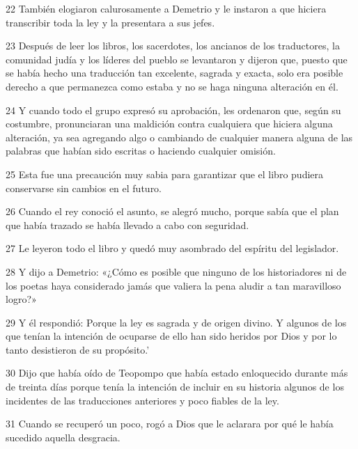 \par 22 También elogiaron calurosamente a Demetrio y le instaron a que hiciera transcribir toda la ley y la presentara a sus jefes.

\par 23 Después de leer los libros, los sacerdotes, los ancianos de los traductores, la comunidad judía y los líderes del pueblo se levantaron y dijeron que, puesto que se había hecho una traducción tan excelente, sagrada y exacta, solo era posible derecho a que permanezca como estaba y no se haga ninguna alteración en él.

\par 24 Y cuando todo el grupo expresó su aprobación, les ordenaron que, según su costumbre, pronunciaran una maldición contra cualquiera que hiciera alguna alteración, ya sea agregando algo o cambiando de cualquier manera alguna de las palabras que habían sido escritas o haciendo cualquier omisión.

\par 25 Esta fue una precaución muy sabia para garantizar que el libro pudiera conservarse sin cambios en el futuro.

\par 26 Cuando el rey conoció el asunto, se alegró mucho, porque sabía que el plan que había trazado se había llevado a cabo con seguridad.

\par 27 Le leyeron todo el libro y quedó muy asombrado del espíritu del legislador.

\par 28 Y dijo a Demetrio: «¿Cómo es posible que ninguno de los historiadores ni de los poetas haya considerado jamás que valiera la pena aludir a tan maravilloso logro?»

\par 29 Y él respondió: Porque la ley es sagrada y de origen divino. Y algunos de los que tenían la intención de ocuparse de ello han sido heridos por Dios y por lo tanto desistieron de su propósito.'

\par 30 Dijo que había oído de Teopompo que había estado enloquecido durante más de treinta días porque tenía la intención de incluir en su historia algunos de los incidentes de las traducciones anteriores y poco fiables de la ley.

\par 31 Cuando se recuperó un poco, rogó a Dios que le aclarara por qué le había sucedido aquella desgracia.

